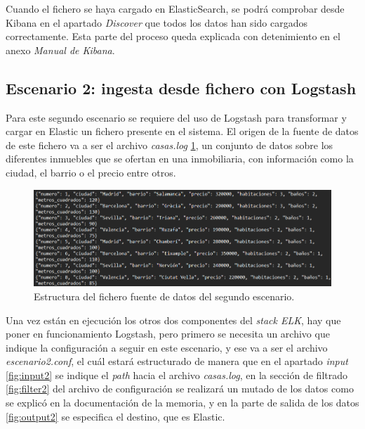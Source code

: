 Cuando el fichero se haya cargado en ElasticSearch, se podrá comprobar desde Kibana en el apartado \textit{Discover} que todos los datos han sido cargados correctamente. Esta parte del proceso queda explicada con detenimiento en el anexo \textit{Manual de Kibana}.

\paragraph{}

\subsection{Escenario 2: ingesta desde fichero con Logstash}
Para este segundo escenario se requiere del uso de Logstash para transformar y cargar en Elastic un fichero presente en el sistema. El origen de la fuente de datos de este fichero va a ser el archivo \textit{casas.log} \ref{fig:casas}, un conjunto de datos sobre los diferentes inmuebles que se ofertan en una inmobiliaria, con información como la ciudad, el barrio o el precio entre otros.
\begin{figure}
    \centering
    \includegraphics[width=1\linewidth]{img/casas.png}
    \caption{Estructura del fichero fuente de datos del segundo escenario.}
    \label{fig:casas}
\end{figure}

Una vez están en ejecución los otros dos componentes del \textit{stack ELK}, hay que poner en funcionamiento Logstash, pero primero se necesita un archivo que indique la configuración a seguir en este escenario, y ese va a ser el archivo \textit{escenario2.conf}, el cuál estará estructurado de manera que en el apartado \textit{input} \ref{fig:input2} se indique el \textit{path} hacia el archivo \textit{casas.log}, en la sección de filtrado \ref{fig:filter2} del archivo de configuración se realizará un mutado de los datos como se explicó en la documentación de la memoria, y en la parte de salida de los datos \ref{fig:output2} se especifica el destino, que es Elastic.

